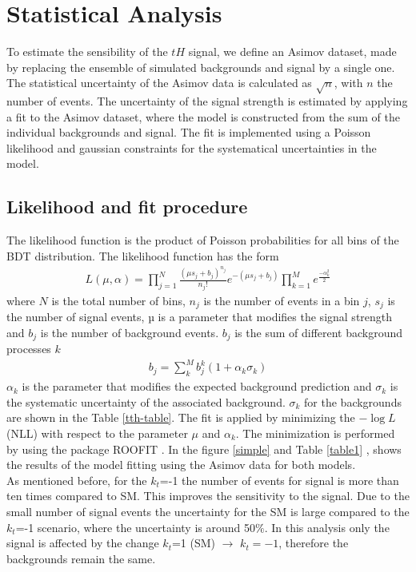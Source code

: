 \chapter{Statistical Analysis}
	To estimate the sensibility of the $tH$ signal, we define an Asimov dataset, made by replacing the ensemble of simulated backgrounds and signal by a single one. The statistical uncertainty of the Asimov data is calculated as $\sqrt{n}$, with $n$ the number of events. The uncertainty of the signal strength is estimated by applying a  fit to the Asimov dataset, where the model
	is constructed from the sum of the individual backgrounds and signal. The fit is implemented using a Poisson likelihood and gaussian constraints for the systematical uncertainties in the model.
	
	
	\section{Likelihood and fit procedure}
	The likelihood function is the product of Poisson probabilities for all bins of the BDT distribution. The likelihood function has the form
	\begin{align}
		L(\mu,\alpha)=\prod_{j=1}^{N}\frac{(\mu s_j +b_j)^{n_j}}{n_j !}e^{-(\mu s_j+b_j)} \prod_{k=1}^M e^{\frac{-\alpha^2_k}{2}}
	\end{align}
	where $N$ is the total number of bins, $n_j$ is the number of events in a bin $j$,  $s_j$ is the number of signal events, µ is a parameter that modifies the signal strength and  $b_j$ is the number of background events.
	$b_j$ is the sum of different background processes $k$
	\begin{align}
		b_j=\sum_k^M b_j^k(1+ \alpha_k \sigma_k)
	\end{align}
	$\alpha_k$ is the parameter that modifies the expected background prediction and $\sigma_k$ is the systematic uncertainty of the associated background. $\sigma_k$ for the backgrounds are shown in the Table \ref{tth-table}.
	The fit is applied by minimizing the $-\log{L}$ (NLL) with respect to the parameter $\mu$ and $\alpha_k$. The minimization is performed by using the package ROOFIT \cite{roofit}. In the figure \ref{simple} and Table \ref{table1} , shows the results of the model fitting using the Asimov data for both models.  \\
	As mentioned before, for the $k_t$=-1 the number of events for signal is more than ten times compared to SM. This improves the sensitivity to the signal. Due to the small number of signal events the uncertainty for the SM is large compared to the $k_t$=-1 scenario, where the uncertainty is around 50$\%$. In this analysis only the signal is affected by the change $k_t$=1 (SM) $\rightarrow$  $k_t=-1$, therefore the backgrounds remain the same.
	
